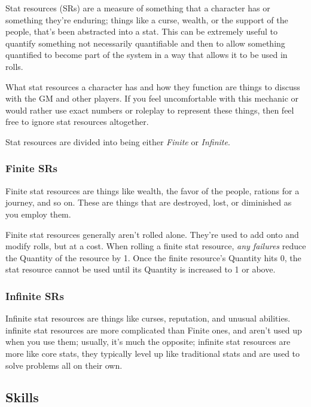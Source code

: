 \documentclass[../main.tex]{subfiles}
\begin{document}
        Stat resources (SRs) are a measure of something that a character has or something they're enduring; things like a curse, wealth, or the support of the people, that's been abstracted into a stat. This can be extremely useful to quantify something not necessarily quantifiable and then to allow something quantified to become part of the system in a way that allows it to be used in rolls.
        
        What stat resources a character has and how they function are things to discuss with the GM and other players. If you feel uncomfortable with this mechanic or would rather use exact numbers or roleplay to represent these things, then feel free to ignore stat resources altogether.

        Stat resources are divided into being either \emph{Finite} or \emph{Infinite}.

        \subsubsection{Finite SRs}
        
        Finite stat resources are things like wealth, the favor of the people, rations for a journey, and so on. These are things that are destroyed, lost, or diminished as you employ them. 

        Finite stat resources generally aren't rolled alone. They're used to add onto and modify rolls, but at a cost. When rolling a finite stat resource, \emph{any failures} reduce the Quantity of the resource by 1. Once the finite resource's Quantity hits 0, the stat resource cannot be used until its Quantity is increased to 1 or above.

        \subsubsection{Infinite SRs}

        Infinite stat resources are things like curses, reputation, and unusual abilities. infinite stat resources are more complicated than Finite ones, and aren't used up when you use them; usually, it's much the opposite; infinite stat resources are more like core stats, they typically level up like traditional stats and are used to solve problems all on their own.

    \subsection{Skills}
\end{document}
